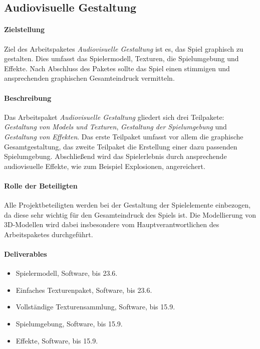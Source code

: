 \subsection{Audiovisuelle Gestaltung}

\paragraph{Zielstellung}\noindent
Ziel des Arbeitspaketes \textit{Audiovisuelle Gestaltung} ist es, das Spiel graphisch zu gestalten. Dies umfasst das Spielermodell, Texturen, die Spielumgebung und Effekte. Nach Abschluss des Paketes sollte das Spiel einen stimmigen und ansprechenden graphischen Gesamteindruck vermitteln.

\paragraph{Beschreibung}\noindent
Das Arbeitspaket \textit{Audiovisuelle Gestaltung} gliedert sich drei Teilpakete: \textit{Gestaltung von Models und Texturen}, \textit{Gestaltung der Spielumgebung} und \textit{Gestaltung von Effekten}. Das erste Teilpaket umfasst vor allem die graphische Gesamtgestaltung, das zweite Teilpaket die Erstellung einer dazu passenden Spielumgebung. Abschließend wird das Spielerlebnis durch ansprechende audiovisuelle Effekte, wie zum Beispiel Explosionen, angereichert.

\paragraph{Rolle der Beteiligten}\noindent
Alle Projektbeteiligten werden bei der Gestaltung der Spielelemente einbezogen, da diese sehr wichtig für den Gesamteindruck des Spiels ist. Die Modellierung von 3D-Modellen wird dabei insbesondere vom Hauptverantwortlichen des Arbeitspaketes durchgeführt.

\paragraph{Deliverables}\noindent
\begin{itemize}
\item Spielermodell, Software, bis 23.6.
\item Einfaches Texturenpaket, Software, bis 23.6.
\item Vollständige Texturensammlung, Software, bis 15.9.
\item Spielumgebung, Software, bis 15.9.
\item Effekte, Software, bis 15.9.
\end{itemize}

